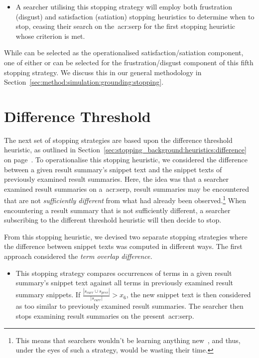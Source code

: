 \begin{itemize}
    \item{ A searcher utilising this stopping strategy will employ both frustration (disgust) and satisfaction (satiation) stopping heuristics to determine when to stop, ceasing their search on the~\gls{acr:serp} for the first stopping heuristic whose criterion is met.}
\end{itemize}

While  can be selected as the operationalised satisfaction/satiation component, one of either  or  can be selected for the frustration/disgust component of this fifth stopping strategy. We discuss this in our general methodology in Section~\ref{sec:method:simulation:grounding:stopping}.

\section{Difference Threshold}
The next set of stopping strategies are based upon the difference threshold heuristic, as outlined in Section~\ref{sec:stopping_background:heuristics:difference} on page~\pageref{sec:stopping_background:heuristics:difference}. To operationalise this stopping heuristic, we considered the difference between a given result summary's snippet text and the snippet texts of previously examined result summaries. Here, the idea was that a searcher examined result summaries on a~\gls{acr:serp}, result summaries may be encountered that are not \emph{sufficiently different} from what had already been observed.\footnote{This means that searchers wouldn't be learning anything new~\citep{nickles1995judgment}, and thus, under the eyes of such a strategy, would be wasting their time.} When encountering a result summary that is not sufficiently different, a searcher subscribing to the different threshold heuristic will then decide to stop.

From this stopping heuristic, we devised two separate stopping strategies where the difference between snippet texts was computed in different ways. The first approach considered the \emph{term overlap difference.}

\begin{itemize}
    \item{ This stopping strategy compares occurrences of terms in a given result summary's snippet text against all terms in previously examined result summary snippets. If $\frac{|s_{curr} \cup s_{prev}|}{|s_{curr}|} > x_6$, the new snippet text is then considered as too similar to previously examined result summaries. The searcher then stops examining result summaries on the present~\gls{acr:serp}.}
\end{itemize}

